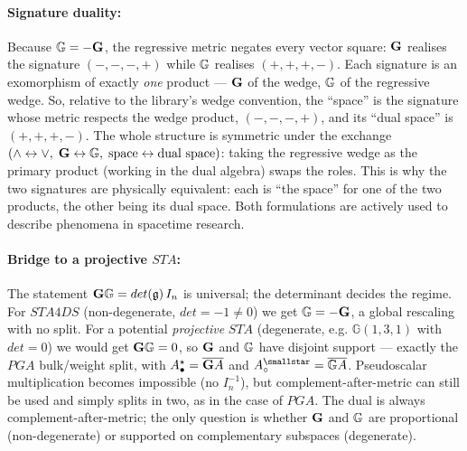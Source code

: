 \paragraph{Signature duality:} Because $\mathbf{\mathbb{G}} = -\mathbf{G}$, the regressive metric
negates every vector square: $\mathbf{G}$ realises the signature $(-,-,-,+)$ while
$\mathbf{\mathbb{G}}$ realises $(+,+,+,-)$. Each signature is an exomorphism of exactly \emph{one}
product --- $\mathbf{G}$ of the wedge, $\mathbf{\mathbb{G}}$ of the regressive wedge. So, relative
to the library's wedge convention, the ``space'' is the signature whose metric respects
the wedge product, $(-,-,-,+)$, and its ``dual space'' is $(+,+,+,-)$. The whole structure
is symmetric under the exchange $(\wedge \leftrightarrow \vee,\; \mathbf{G}
\leftrightarrow \mathbf{\mathbb{G}},\; \text{space} \leftrightarrow \text{dual space})$: taking
the regressive wedge as the primary product (working in the dual algebra) swaps the roles.
This is why the two signatures are physically equivalent: each is ``the space'' for one of
the two products, the other being its dual space. Both formulations are actively used to
describe phenomena in spacetime research.

\paragraph{Bridge to a projective $STA$:} The statement $\mathbf{G}\mathbf{\mathbb{G}} =
det(\mathfrak{g})\,I_n$ is universal; the determinant decides the regime. For $STA4DS$
(non-degenerate, $det = -1 \neq 0$) we get $\mathbf{\mathbb{G}} = -\mathbf{G}$, a global rescaling
with no split. For a potential \emph{projective} $STA$ (degenerate, e.g.
$\mathbb{G}(1,3,1)$ with $det = 0$) we would get $\mathbf{G}\mathbf{\mathbb{G}} = 0$, so
$\mathbf{G}$ and $\mathbf{\mathbb{G}}$ have disjoint support --- exactly the $PGA$ bulk/weight
split, with ${A}_\bullet^{\star} = \overline{\mathbf{G}A}$ and $\weight{A}^{\smallstar} =
\rcmpl{\rmetric{G}A}$. Pseudoscalar multiplication becomes impossible (no $I_n^{-1}$), but
complement-after-metric can still be used and simply splits in two, as in the case of
$PGA$. The dual is always complement-after-metric; the only question is whether
$\mathbf{G}$ and $\mathbf{\mathbb{G}}$ are proportional (non-degenerate) or supported on
complementary subspaces (degenerate).

